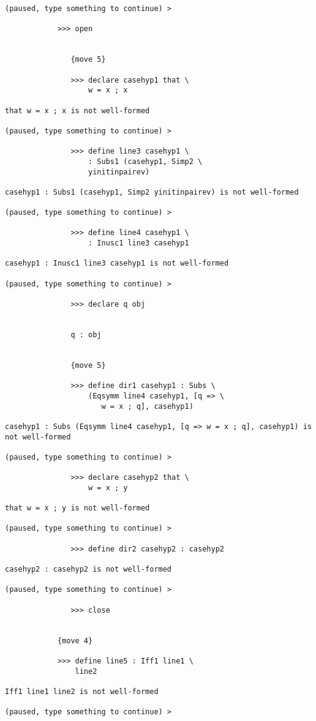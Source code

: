 \documentclass[12pt]{article}
\begin{document}
\begin{verbatim}
(paused, type something to continue) >

            >>> open


               {move 5}

               >>> declare casehyp1 that \
                   w = x ; x

that w = x ; x is not well-formed

(paused, type something to continue) >

               >>> define line3 casehyp1 \
                   : Subs1 (casehyp1, Simp2 \
                   yinitinpairev)

casehyp1 : Subs1 (casehyp1, Simp2 yinitinpairev) is not well-formed

(paused, type something to continue) >

               >>> define line4 casehyp1 \
                   : Inusc1 line3 casehyp1

casehyp1 : Inusc1 line3 casehyp1 is not well-formed

(paused, type something to continue) >

               >>> declare q obj


               q : obj


               {move 5}

               >>> define dir1 casehyp1 : Subs \
                   (Eqsymm line4 casehyp1, [q => \
                      w = x ; q], casehyp1)

casehyp1 : Subs (Eqsymm line4 casehyp1, [q => w = x ; q], casehyp1) is not well-formed

(paused, type something to continue) >

               >>> declare casehyp2 that \
                   w = x ; y

that w = x ; y is not well-formed

(paused, type something to continue) >

               >>> define dir2 casehyp2 : casehyp2

casehyp2 : casehyp2 is not well-formed

(paused, type something to continue) >

               >>> close


            {move 4}

            >>> define line5 : Iff1 line1 \
                line2

Iff1 line1 line2 is not well-formed

(paused, type something to continue) >


\end{verbatim}
\end{document}

